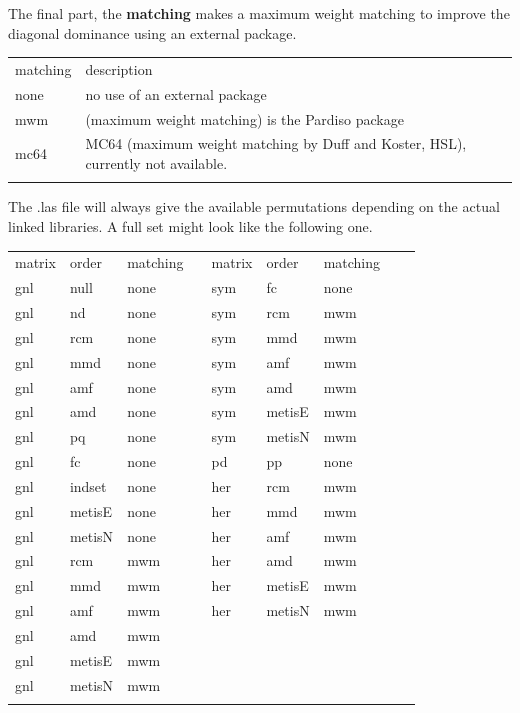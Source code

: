 The final part, the \textbf{matching} makes a maximum weight matching to improve the diagonal dominance using an external package.
\begin{center}
\begin{tabular}{lp{}}
\hline\noalign{\smallskip}
matching & description \\
\noalign{\smallskip}\hline\noalign{\smallskip}
none & no use of an external package\\
mwm & (maximum weight matching) is the Pardiso package\\
mc64 & MC64 (maximum weight matching by Duff and Koster, HSL),
   currently not available.\\
\noalign{\smallskip}\hline
\end{tabular}
\end{center}

The .las file will always give the available permutations depending on the
actual linked libraries. A full set might look like the following one.
\begin{center}
\begin{tabular}{llllllllp{}}
\hline\noalign{\smallskip}
matrix & order & matching & & matrix & order & matching \\
\noalign{\smallskip}\hline\noalign{\smallskip}
gnl & null  & none& & sym & fc    & none\\
gnl & nd    & none& & sym & rcm   & mwm \\
gnl & rcm   & none& & sym & mmd   & mwm \\
gnl & mmd   & none& & sym & amf   & mwm \\
gnl & amf   & none& & sym & amd   & mwm \\
gnl & amd   & none& & sym & metisE& mwm \\
gnl & pq    & none& & sym & metisN& mwm \\
gnl & fc    & none& & pd  & pp    & none\\
gnl & indset& none& & her & rcm   & mwm \\
gnl & metisE& none& & her & mmd   & mwm \\
gnl & metisN& none& & her & amf   & mwm \\
gnl & rcm   & mwm & & her & amd   & mwm \\
gnl & mmd   & mwm & & her & metisE& mwm \\
gnl & amf   & mwm & & her & metisN& mwm \\
gnl & amd   & mwm & &\\ 
gnl & metisE& mwm & &\\ 
gnl & metisN& mwm & &\\ 
\noalign{\smallskip}\hline
\end{tabular}
\end{center}

